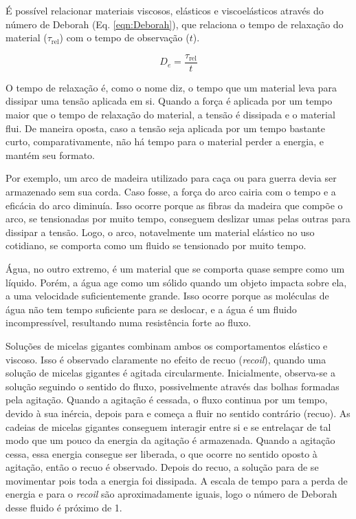 		É possível relacionar materiais viscosos, elásticos e viscoelásticos através do número de Deborah (Eq. \ref{eqn:Deborah}), que relaciona o tempo de relaxação do material (\(\tau_{\text{rel}}\)) com o tempo de observação (\(t\)).
		
		\begin{equation}
			D_e = \dfrac{\tau_{\text{rel}}}{t}
			\label{eqn:Deborah}
		\end{equation}
		
		O tempo de relaxação é, como o nome diz, o tempo que um material leva para dissipar uma tensão aplicada em si. Quando a força é aplicada por um tempo maior que o tempo de relaxação do material, a tensão é dissipada e o material flui. De maneira oposta, caso a tensão seja aplicada por um tempo bastante curto, comparativamente, não há tempo para o material perder a energia, e mantém seu formato.
		
		Por exemplo, um arco de madeira utilizado para caça ou para guerra devia ser armazenado sem sua corda. Caso fosse, a força do arco cairia com o tempo e a eficácia do arco diminuía. Isso ocorre porque as fibras da madeira que compõe o arco, se tensionadas por muito tempo, conseguem deslizar umas pelas outras para dissipar a tensão. Logo, o arco, notavelmente um material elástico no uso cotidiano, se comporta como um fluido se tensionado por muito tempo.
		
		Água, no outro extremo, é um material que se comporta quase sempre como um líquido. Porém, a água age como um sólido quando um objeto impacta sobre ela, a uma velocidade suficientemente grande. Isso ocorre porque as moléculas de água não tem tempo suficiente para se deslocar, e a água é um fluido incompressível, resultando numa resistência forte ao fluxo.
		
		Soluções de micelas gigantes combinam ambos os comportamentos elástico e viscoso. Isso é observado claramente no efeito de recuo (\emph{recoil}), quando uma solução de micelas gigantes é agitada circularmente. Inicialmente, observa-se a solução seguindo o sentido do fluxo, possivelmente através das bolhas formadas pela agitação. Quando a agitação é cessada, o fluxo continua por um tempo, devido à sua inércia, depois para e começa a fluir no sentido contrário (recuo). As cadeias de micelas gigantes conseguem interagir entre si e se entrelaçar de tal modo que um pouco da energia da agitação é armazenada. Quando a agitação cessa, essa energia consegue ser liberada, o que ocorre no sentido oposto à agitação, então o recuo é observado. Depois do recuo, a solução para de se movimentar pois toda a energia foi dissipada. A escala de tempo para a perda de energia e para o \emph{recoil} são aproximadamente iguais, logo o número de Deborah desse fluido é próximo de 1.
		
